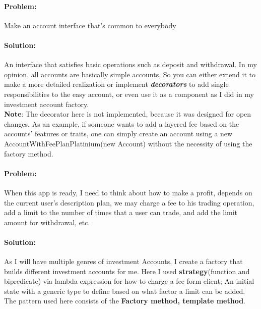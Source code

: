 \documentclass[a4paper,12pt]{report}
\begin{document}
    \paragraph{Problem:} Make an account interface that's common to everybody

    \paragraph{Solution:} An interface that satisfies basic operations such as deposit and withdrawal. In my opinion, all accounts are basically simple accounts, So you can either extend it to make a more detailed realization or implement \textbf{\textit{decorators}} to add single responsibilities to the easy account, or even use it as a component as I did in my investment account factory.
    \\ \textbf{Note}: The decorator here is not implemented, because it was designed for open changes. As an example, if someone wants to add a layered fee based on the accounts' features or traits, one can simply create an account using a new AccountWithFeePlanPlatinium(new Account) without the necessity of using the factory method.

    \paragraph*{Problem:} When this app is ready, I need to think about how to make a profit, depends on the current user's description plan, we may charge a fee to his trading operation, add a limit to the number of times that a user can trade, and add the limit amount for withdrawal, etc. 

    \paragraph*{Solution:} As I will have multiple genres of investment Accounts, I create a factory that builds different investment accounts for me. Here I used \textbf{strategy}(function and bipredicate) via lambda expression for how to charge a fee form client;
    An initial state with a generic type to define based on what factor a limit can be added. The pattern used here consists of the \textbf{Factory method, template method}. 
\end{document}
